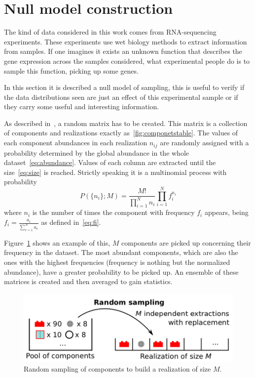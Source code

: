 \section{Null model construction}\label{sec:nullmodel}
The kind of data considered in this work comes from RNA-sequencing experiments. These experiments use wet biology methods to extract information from samples. If one imagines it exists an unknown function that describes the gene expression across the samples considered, what experimental people do is to sample this function, picking up some genes.

In this section it is described a null model of sampling, this is useful to verify if the data distributions seen are just an effect of this experimental sample or if they carry some useful and interesting information.

As described in~\cite{Mazzolini2018}, a random matrix has to be created. This matrix is a collection of components and realizations exactly as~\ref{fig:componetstable}. The values of each component abundances in each realization $n_{i j}$ are randomly assigned with a probability determined by 
the global abundance in the whole dataset~\ref{eq:abundance}. Values of each column are extracted until the size~\ref{eq:size} is 
reached. Strictly speaking it is a multinomial process with probability
\begin{equation}
P\left( \{ n_i\} ;M\right) =\frac{M!}{\prod_{i=1}^{N} n_i}\prod_{i=1}^N f_i^{n_i}
\end{equation}
where $n_i$ is the number of times the component with frequency $f_i$ appears, being $f_i=\frac{a_i}{\sum_{c=1}^{N}a_{c}}$ as defined in~\ref{eq:fi}.

Figure~\ref{fig:structure/randomsampling} shows an example of this, $M$ components are picked up concerning their frequency in the dataset. The most abundant components, which are also the ones with the highest frequencies (frequency is nothing but the normalized abundance), have a greater probability to be picked up. An ensemble of these matrices is created and then averaged to gain statistics.
\begin{figure}[htb!]
    \centering
    \includegraphics[width=0.8\linewidth]{pictures/structure/randomsampling.png}
    \caption{Random sampling of components to build a realization of size $M$.}
    \label{fig:structure/randomsampling}
\end{figure}

